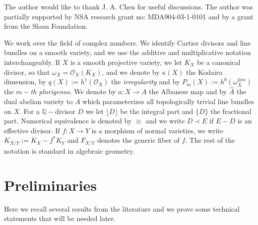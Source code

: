 \documentclass[10pt, a4paper]{amsart}
\newcommand\alb{{ a}}
\newcommand\Alb{{ A}}
\newcommand\ot{{\otimes}}
\newcommand\OO{{\mathcal{O}}}
\newcommand\Q{{\mathbb{Q}}}
\begin{document}
 The author would like to thank J. A. Chen for 
useful discussions. The author was partially supported
by NSA research grant no: MDA904-03-1-0101 and by a grant from the
Sloan Foundation.


\medskip
{}
We work over the field of complex numbers.
We identify Cartier divisors and line bundles on
a smooth variety, and we use the additive and
multiplicative notation interchangeably. If
$X$ is a smooth projective variety, we let $K_X$ be a  canonical divisor,
so that $\omega _X=\OO_X(K_X)$, and we denote by
$\kappa(X)$ the Kodaira dimension,  by
$q(X):=h^1(\OO_X)$ the {\em irregularity} and by $P_m(X):=h^0(\omega _X^{\ot m
})$
the {\em $m-$th plurigenus}. 
We denote by  $\alb \colon X\to \Alb$ the Albanese map  and by 
$\hat{A}$ the dual abelian variety to $\Alb $ which parameterizes all
topologically trivial line bundles on $X$.
For a $\Q -$divisor $D$
we let $\lfloor D\rfloor$ be the integral part and
$\{D\}$ the fractional part. Numerical
equivalence is denoted by $\equiv$ and we write $D\prec E$ if
$E-D$ is an effective divisor. If $f\colon X\to Y$ is a
morphism of normal varieties, we write $K_{X/Y}:=K_X-f^*K_Y$ and $F_{X/Y}$ denotes
the generic fiber of $f$. 
The rest of the notation is
standard in algebraic geometry.
\section{Preliminaries }
Here we recall several results from the literature and we prove some technical
statements that will be needed later.
\end{document}
